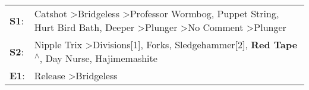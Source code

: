 \begin{supertabular}{p{0.03\textwidth}p{0.92\textwidth}}
 \textbf{S1}:  &  Catshot\textsuperscript{} \textgreater \enspace Bridgeless\textsuperscript{} \textgreater \enspace Professor Wormbog\textsuperscript{}, \enspace Puppet String\textsuperscript{}, \enspace Hurt Bird Bath\textsuperscript{}, \enspace Deeper\textsuperscript{} \textgreater \enspace Plunger\textsuperscript{} \textgreater \enspace No Comment\textsuperscript{} \textgreater \enspace Plunger\textsuperscript{}  \enspace  \\
 \textbf{S2}:  &                                                                                                             Nipple Trix\textsuperscript{} \textgreater \enspace Divisions[1]\textsuperscript{}, \enspace Forks\textsuperscript{}, \enspace Sledgehammer[2]\textsuperscript{}, \enspace \textbf{Red Tape\textsuperscript{$\wedge$}}, \enspace Day Nurse\textsuperscript{}, \enspace Hajimemashite\textsuperscript{}  \enspace  \\
 \textbf{E1}:  &                                                                                                                                                                                                                                                                                                                                       Release\textsuperscript{} \textgreater \enspace Bridgeless\textsuperscript{}  \enspace  \\
\end{supertabular}
